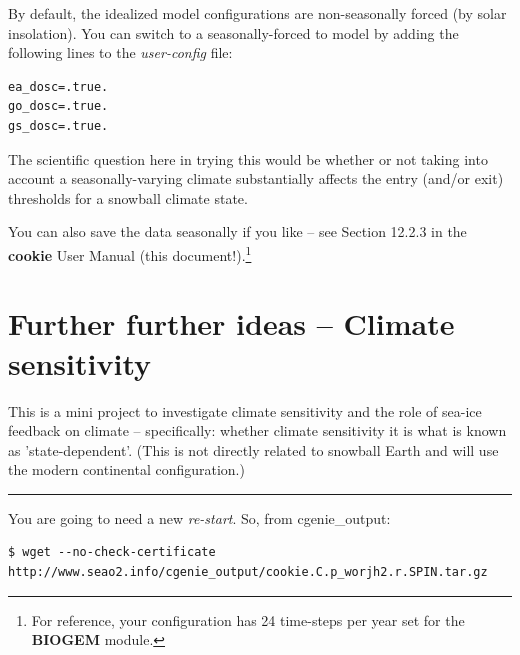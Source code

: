 By default, the idealized model configurations are non-seasonally forced (by solar insolation). You can switch to a seasonally-forced to model by adding the following lines to the \textit{user-config} file:

\vspace{-3mm}\small\begin{verbatim}
ea_dosc=.true.
go_dosc=.true.
gs_dosc=.true.
\end{verbatim}\normalsize\vspace{-2mm}

\noindent The scientific question here in trying this would be whether or not taking into account a seasonally-varying climate substantially affects the entry (and/or exit) thresholds for a snowball climate state.

You can also save the data seasonally if you like – see Section 12.2.3 in the \textbf{cookie} User Manual (this document!).\footnote{For reference, your configuration has 24 time-steps per year set for the \textbf{BIOGEM} module.}

\newpage

\section{Further further ideas -- Climate sensitivity}

This is a mini project to investigate climate sensitivity and the role of sea-ice feedback on climate -- specifically: whether climate sensitivity it is what is known as 'state-dependent'. (This is not directly related to snowball Earth and will use the modern continental configuration.)

\vspace{1mm}\noindent\rule{4cm}{0.5pt}\vspace{2mm}

\noindent You are going to need a new \textit{re-start}. So, from \textsf{\footnotesize cgenie\_output}:

\vspace{-2mm}\small\begin{verbatim}
$ wget --no-check-certificate 
http://www.seao2.info/cgenie_output/cookie.C.p_worjh2.r.SPIN.tar.gz
\end{verbatim}\normalsize\vspace{-2mm}

